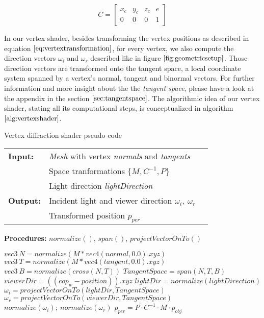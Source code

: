 \begin{equation}
  C = \begin{bmatrix} x_c & y_c & z_c & e \\ 0 & 0 & 0 & 1 \end{bmatrix}
  \label{eq:cameramatrixeq}
\end{equation}

In our vertex shader, besides transforming the vertex positions as described in equation $\ref{eq:vertextransformation}$, for every vertex, we also compute the direction vectors $\omega_i$ and $\omega_r$ described like in figure $\ref{fig:geometricsetup}$. Those direction vectors are transformed onto the tangent space, a local coordinate system spanned by a vertex's normal, tangent and binormal vectors. For further information and more insight about the the \emph{tangent space}, please have a look at the appendix in the section $\ref{sec:tangentspace}$. The algorithmic idea of our vertex shader, stating all its computational steps, is conceptualized in algorithm $\ref{alg:vertexshader}$.

\begin{algorithm}[H]
\caption{Vertex diffraction shader pseudo code}
\begin{table}[H]
  \begin{tabular}{@{}lll@{}}
    \textbf{Input:} & \emph{Mesh} with vertex \emph{normals} and \emph{tangents}  \\
    & Space tranformations $\{M, C^{-1}, P\}$  \\
    & Light direction \emph{lightDirection}  \\
    \textbf{Output:} & Incident light and viewer direction $\omega_i,\ \omega_r$ \\
    & Transformed position $p_{per}$ \\
  \end{tabular} 
\end{table}
\textbf{Procedures:} $normalize()$, $span()$, $projectVectorOnTo()$  \\
\setlength{\fboxrule}{0pt} 
\begin{boxedminipage}{1.0\textwidth}
  \begin{algorithmic}[1]
        \State $ vec3 \ N = normalize(M * vec4(normal,0.0).xyz)$
        \State $ vec3 \ T = normalize(M * vec4(tangent,0.0).xyz)$
        \State $ vec3 \ B = normalize(cross(N, T))$
        \State $ TangentSpace = span(N, T, B)$
        \State $ viewerDir = ((cop_{w}-position)).xyz$
        \State $ lightDir = normalize(lightDirection)$
        \State $ \omega_i = projectVectorOnTo(lightDir, TangentSpace)$
        \State $ \omega_r = projectVectorOnTo(viewerDir, TangentSpace)$
        \State $normalize(\omega_i); \ normalize(\omega_r)$
        \State $p_{per} = P \cdot C^{-1} \cdot M \cdot p_{obj}$
      \EndFor
  \end{algorithmic}
  \end{boxedminipage}
  \vskip1.5pt
\label{alg:vertexshader}
\end{algorithm}

